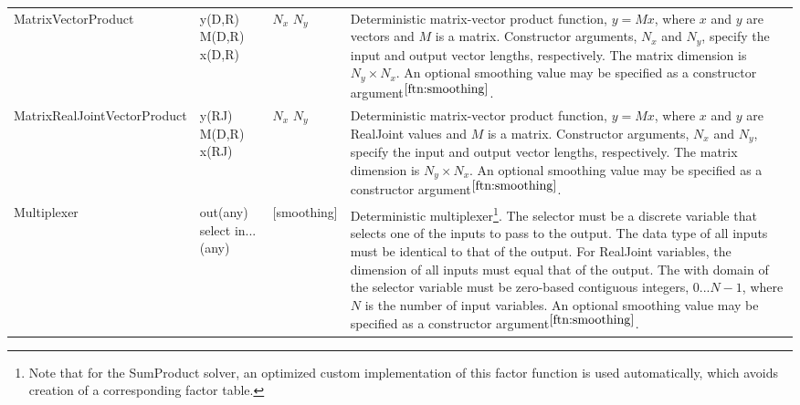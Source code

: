 \begin{longtable} {p{3.5cm} p{2.2cm} p{2cm} p{7cm}}
%
MatrixVectorProduct & y(D,R) \newline M(D,R) \newline x(D,R) & $N_{x}$ \newline $N_{y}$ \newline [smoothing] & Deterministic matrix-vector product function, $y = Mx$, where $x$ and $y$ are vectors and $M$ is a matrix. Constructor arguments, $N_{x}$ and $N_{y}$, specify the input and output vector lengths, respectively. The matrix dimension is $N_{y} \times N_{x}$. An optional smoothing value may be specified as a constructor argument$^{\ref{ftn:smoothing}}$. \\
%
MatrixRealJoint\newline VectorProduct & y(RJ) \newline M(D,R) \newline x(RJ) & $N_{x}$ \newline $N_{y}$ \newline [smoothing] & Deterministic matrix-vector product function, $y = Mx$, where $x$ and $y$ are RealJoint values and $M$ is a matrix. Constructor arguments, $N_{x}$ and $N_{y}$, specify the input and output vector lengths, respectively. The matrix dimension is $N_{y} \times N_{x}$. An optional smoothing value may be specified as a constructor argument$^{\ref{ftn:smoothing}}$. \\
%
Multiplexer & out(any) \newline select \newline in...(any) & [smoothing] & Deterministic multiplexer\footnote{Note that for the SumProduct solver, an optimized custom implementation of this factor function is used automatically, which avoids creation of a corresponding factor table.}.  The selector must be a discrete variable that selects one of the inputs to pass to the output.  The data type of all inputs must be identical to that of the output.  For RealJoint variables, the dimension of all inputs must equal that of the output.  The with domain of the selector variable must be zero-based contiguous integers, $0...N-1$, where $N$ is the number of input variables.  An optional smoothing value may be specified as a constructor argument$^{\ref{ftn:smoothing}}$. \\

\end{longtable}
